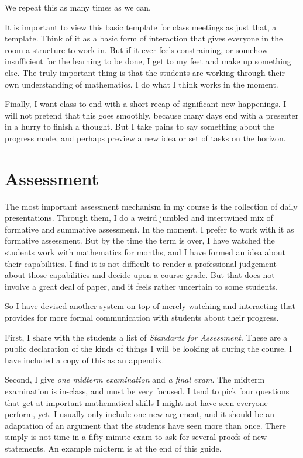\begin{annotation}
We repeat this as many times as we can.

It is important to view this basic template for class meetings as just that, a template. Think of it as a basic form of interaction that gives everyone in the room a structure to work in. But if it ever feels constraining, or somehow insufficient for the learning to be done, I get to my feet and make up something else. The truly important thing is that the students are working through their own understanding of mathematics. I do what I think works in the moment.

Finally, I want class to end with a short recap of significant new happenings. I will not pretend that this goes smoothly, because many days end with a presenter in a hurry to finish a thought. But I take pains to say something about the progress made, and perhaps preview a new idea or set of tasks on the horizon.



\section*{Assessment}

The most important assessment mechanism in my course is the collection of daily presentations. Through them, I do a weird jumbled and intertwined mix of formative and summative assessment. In the moment, I prefer to work with it as formative assessment. But by the time the term is over, I have watched the students work with mathematics for months, and I have formed an idea about their capabilities. I find it is not difficult to render a professional judgement about those capabilities and decide upon a course grade. But that does not involve a great deal of paper, and it feels rather uncertain to some students. 

So I have devised another system on top of merely watching and interacting that provides for more formal communication with students about their progress. 

First, I share with the students a list of \emph{Standards for Assessment}. These are a public declaration of the kinds of things I will be looking at during the course. I have included a copy of this as an appendix.

Second, I give \emph{one midterm examination} and \emph{a final exam}.
The midterm examination is in-class, and must be very focused.
I tend to pick four questions that get at important mathematical skills I might not have seen everyone perform, yet.
I usually only include one new argument, and it should be an adaptation of an argument that the students have seen more than once.
There simply is not time in a fifty minute exam to ask for several proofs of new statements.
An example midterm is at the end of this guide.


\end{annotation}
